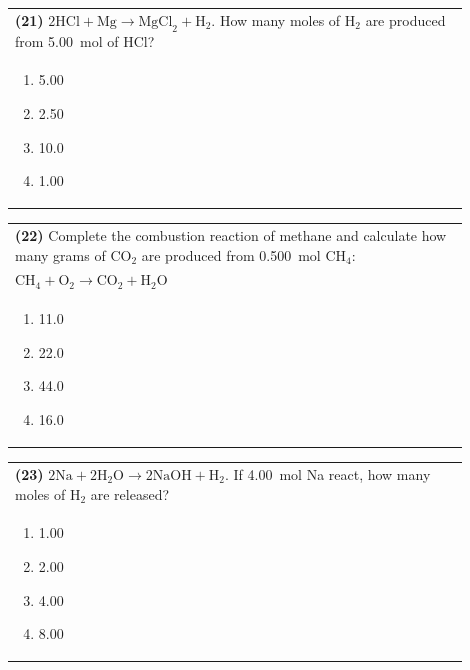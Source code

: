 \documentclass{article}
\begin{document}
\newpage

\noindent\begin{tabular}{|p{0.9\linewidth}|}
\hline
\textbf{(21)} $2\text{HCl} + \text{Mg} \rightarrow \text{MgCl}_2 + \text{H}_2$. How many moles of H$_2$ are produced from 5.00~mol of HCl?\\[0.2cm]

\begin{minipage}[t]{0.85\linewidth}
\begin{enumerate}[label=\alph*.]
\item 5.00
\item 2.50
\item 10.0
\item 1.00
\end{enumerate}
\end{minipage}\\[0.2cm]
\hline
\end{tabular}

\vspace{0.2cm}
\noindent\begin{tabular}{|p{0.9\linewidth}|}
\hline
\textbf{(22)} Complete the combustion reaction of methane and calculate how many grams of CO$_2$ are produced from 0.500~mol CH$_4$: \\[0.2cm]
\hspace{1em} $\text{CH}_4 + \text{O}_2 \rightarrow \text{CO}_2 + \text{H}_2\text{O}$ \\[0.2cm]

\begin{minipage}[t]{0.85\linewidth}
\begin{enumerate}[label=\alph*.]
\item 11.0
\item 22.0
\item 44.0
\item 16.0
\end{enumerate}
\end{minipage}\\[0.2cm]
\hline
\end{tabular}

\vspace{0.2cm}
\noindent\begin{tabular}{|p{0.9\linewidth}|}
\hline
\textbf{(23)} $2\text{Na} + 2\text{H}_2\text{O} \rightarrow 2\text{NaOH} + \text{H}_2$. If 4.00~mol Na react, how many moles of H$_2$ are released?\\[0.2cm]

\begin{minipage}[t]{0.85\linewidth}
\begin{enumerate}[label=\alph*.]
\item 1.00
\item 2.00
\item 4.00
\item 8.00
\end{enumerate}
\end{minipage}\\[0.2cm]
\hline
\end{tabular}
\end{document}
